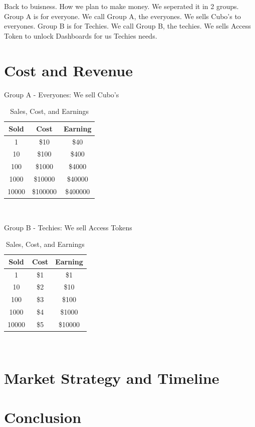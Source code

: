 \documentclass{report}
\begin{document}
Back to buisness. How we plan to make money.
We seperated it in 2 groups.
Group A is for everyone. We call Group A, the everyones. We sells Cubo's to everyones.
Group B is for Techies. We call Group B, the techies. We sells Access Token to unlock Dashboards for us Techies needs.

\newpage

\section{Cost and Revenue}

Group A - Everyones: We sell Cubo's
\begin{table}[hbp]
	\centering
	\caption{Sales, Cost, and Earnings}
	\label{tab:sales}
	\begin{tabular}{|c|c|c|}
		\hline
		\textbf{Sold} & \textbf{Cost} & \textbf{Earning} \\
		\hline
		1             & \$10          & \$40             \\
		\hline
		10            & \$100         & \$400            \\
		\hline
		100           & \$1000        & \$4000           \\
		\hline
		1000          & \$10000       & \$40000          \\
		\hline
		10000         & \$100000      & \$400000         \\
		\hline
	\end{tabular}
\end{table}
\\
\lipsum[1][1-10]

\vspace{2em}

\hspace{-1em}Group B - Techies: We sell Access Tokens
\begin{table}[hbp]
	\centering
	\caption{Sales, Cost, and Earnings}
	\label{tab:sales}
	\begin{tabular}{|c|c|c|}
		\hline
		\textbf{Sold} & \textbf{Cost} & \textbf{Earning} \\
		\hline
		1             & \$1           & \$1              \\
		\hline
		10            & \$2           & \$10             \\
		\hline
		100           & \$3           & \$100            \\
		\hline
		1000          & \$4           & \$1000           \\
		\hline
		10000         & \$5           & \$10000          \\
		\hline
	\end{tabular}
\end{table}
\\
\lipsum[1][1-10]

\newpage

\section{Market Strategy and Timeline}
\section{Conclusion}
\end{document}
